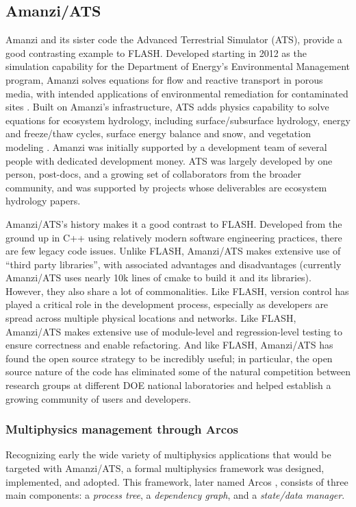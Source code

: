 \subsection{Amanzi/ATS}
\label{sec:amanzi}
%
Amanzi and its sister code the Advanced Terrestrial Simulator (ATS), provide a good contrasting example to FLASH.
Developed starting in 2012 as the simulation capability for the Department of Energy's Environmental Management program, Amanzi solves equations for flow and reactive transport in porous media, with intended applications of environmental remediation for contaminated sites \cite{MoultonMD12}.
Built on Amanzi's infrastructure, ATS adds physics capability to solve equations for ecosystem hydrology, including surface/subsurface hydrology, energy and freeze/thaw cycles, surface energy balance and snow, and vegetation modeling \cite{PainterMW13,AtchleyPHC15}.
Amanzi was initially supported by a development team of several people with dedicated development money.
ATS was largely developed by one person, post-docs, and a growing set of collaborators from the broader community, and was supported by projects whose deliverables are ecosystem hydrology papers.

Amanzi/ATS's history makes it a good contrast to FLASH.
Developed from the ground up in C++ using relatively modern software engineering practices, there are few legacy code issues.
Unlike FLASH, Amanzi/ATS makes extensive use of ``third party libraries'', with associated advantages and disadvantages (currently Amanzi/ATS uses nearly 10k lines of cmake to build it and its libraries).
However, they also share a lot of commonalities.
Like FLASH, version control has played a critical role in the development process, especially as developers are spread across multiple physical locations and networks.
Like FLASH, Amanzi/ATS makes extensive use of module-level and regression-level testing to ensure correctness and enable refactoring.
And like FLASH, Amanzi/ATS has found the open source strategy to be incredibly useful; in particular, the open source nature of the code has eliminated some of the natural competition between research groups at different DOE national laboratories and helped establish a growing community of users and developers.

\subsubsection{Multiphysics management through Arcos}
\label{sec:amanzi:arcos}
%
Recognizing early the wide variety of multiphysics applications that would be targeted with Amanzi/ATS, a formal multiphysics framework was designed, implemented, and adopted.
This framework, later named Arcos \cite{CoonMP16}, consists of three main components: a \emph{process tree}, a \emph{dependency graph}, and a \emph{state/data manager}.

